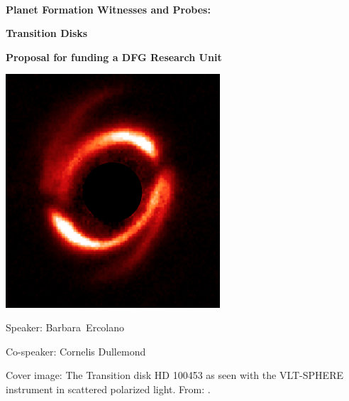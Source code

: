 \documentclass[10pt,fleqn,twoside]{article}
\newcommand{\Titlecol}{\color{Black}}
\begin{document}
\pagestyle{empty}
\mbox{}
\vspace{1cm}\\

\centerline{\Titlecol\huge \bf Planet Formation Witnesses and Probes:}
\vspace{0.5cm}
\centerline{\Titlecol\huge \bf Transition Disks}
\vspace{2cm}
\centerline{\Titlecol\Large \bf Proposal for funding a DFG Research Unit}
\vspace{2cm}
\centerline{\includegraphics[width=0.6\textwidth]{figures/HD100453.png}}
\vspace{1cm}
\centerline{\Large Speaker: Barbara~Ercolano}
\vspace{0.5cm}
\centerline{\Large Co-speaker: Cornelis Dullemond}


\pagebreak[4]

\mbox{}
\vfill
Cover image: The Transition disk HD 100453 as seen with the VLT-SPHERE 
instrument in scattered polarized light. From: \citet{2017A&A...597A..42B}.

\pagebreak[4]
\end{document}
